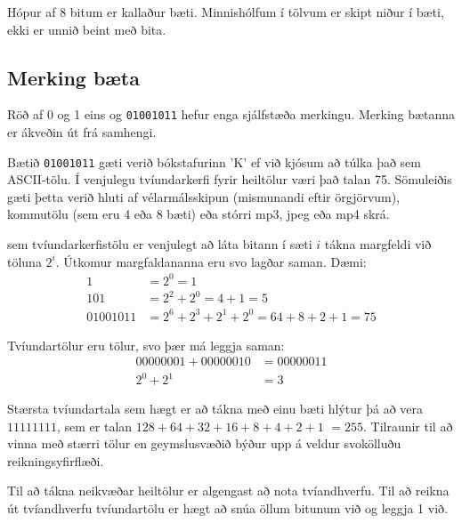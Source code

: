 \documentclass[justified,nobib]{tufte-handout}
\begin{document}
Hópur af 8 bitum er kallaður bæti. Minnishólfum í tölvum er skipt niður í bæti, ekki er unnið beint með bita.

\subsection{Merking bæta}
Röð af 0 og 1 eins og \texttt{01001011} hefur enga sjálfstæða merkingu. Merking bætanna er ákveðin út frá samhengi.

Bætið \texttt{01001011} gæti verið bókstafurinn 'K' ef við kjósum að túlka það sem ASCII-tölu. Í venjulegu tvíundarkerfi fyrir heiltölur væri það talan 75. Sömuleiðis gæti þetta verið hluti af vélarmálsskipun (mismunandi eftir örgjörvum), kommutölu (sem eru 4 eða 8 bæti) eða stórri mp3, jpeg eða mp4 skrá.

 sem tvíundarkerfistölu er venjulegt að láta bitann í sæti $i$ tákna margfeldi við töluna $2^i$. Útkomur margfaldananna eru svo lagðar saman. Dæmi:
\begin{align*}
    1 		&=  2^0  	= 1\\
    101		&=  2^2 + 2^0  =  4 + 1  =  5\\
    01001011	&=  2^6 + 2^3 + 2^1 + 2^0  =  64 + 8 + 2 + 1 = 75
\end{align*}

Tvíundartölur eru tölur, svo þær má leggja saman: 
\begin{align*}
    00000001 + 00000010 &= 00000011\\
    2^0 + 2^1 &= 3
\end{align*}

Stærsta tvíundartala sem hægt er að tákna með einu bæti hlýtur þá að vera $11111111$, sem er talan $128+64+32+16+8+4+2+1$  $=  255$. Tilraunir til að vinna með stærri tölur en geymslusvæðið býður upp á veldur svokölluðu reikningsyfirflæði.

Til að tákna neikvæðar heiltölur er algengast að nota tvíandhverfu. Til að reikna út tvíandhverfu tvíundartölu er hægt að snúa öllum bitunum við og leggja 1 við.
\end{document}
